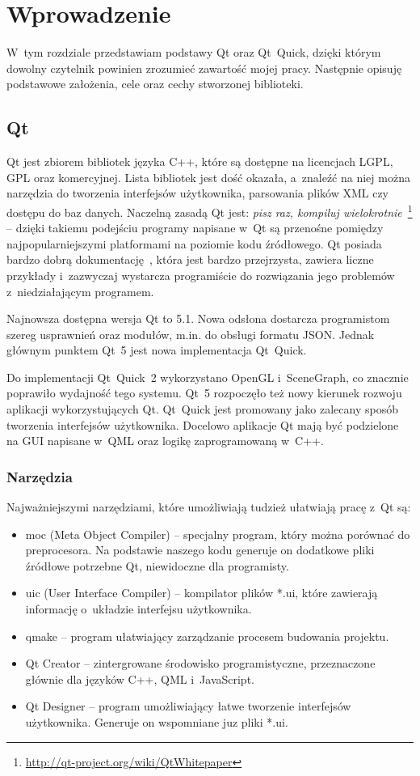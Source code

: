 \chapter{Wprowadzenie}
W~tym rozdziale przedstawiam podstawy Qt oraz Qt~Quick, dzięki którym dowolny czytelnik powinien zrozumieć zawartość mojej pracy. Następnie opisuję podstawowe założenia, cele oraz cechy stworzonej biblioteki.

\section{Qt}
Qt jest zbiorem bibliotek języka C++, które są dostępne na licencjach LGPL, GPL oraz komercyjnej. Lista bibliotek jest dość okazała, a~znaleźć na niej można narzędzia do tworzenia interfejsów użytkownika, parsowania plików XML czy dostępu do baz danych. Naczelną zasadą Qt jest: \textit{pisz raz, kompiluj wielokrotnie}~\footnote{\url{http://qt-project.org/wiki/QtWhitepaper}} -- dzięki takiemu podejściu programy napisane w~Qt są przenośne pomiędzy najpopularniejszymi platformami na poziomie kodu źródłowego. Qt posiada bardzo dobrą dokumentację~\cite{Qt:Dokumentacja}, która jest bardzo przejrzysta, zawiera liczne przykłady i~zazwyczaj wystarcza programiście do rozwiązania jego problemów z~niedziałającym programem.

Najnowsza dostępna wersja Qt to 5.1. Nowa odsłona dostarcza programistom szereg usprawnień oraz modułów, m.in. do obsługi formatu JSON. Jednak głównym punktem Qt~5 jest nowa implementacja Qt~Quick. 

Do implementacji Qt~Quick~2 wykorzystano OpenGL i~SceneGraph, co znacznie poprawiło wydajność tego systemu. Qt~5 rozpoczęło też nowy kierunek rozwoju aplikacji wykorzystujących Qt. Qt~Quick jest promowany jako zalecany sposób tworzenia interfejsów użytkownika. Docelowo aplikacje Qt mają być podzielone na GUI napisane w~QML oraz logikę zaprogramowaną w~C++.

\subsection{Narzędzia}
Najważniejszymi narzędziami, które umożliwiają tudzież ułatwiają pracę z~Qt są:
\begin{itemize}
\item moc (Meta Object Compiler) -- specjalny program, który można porównać do preprocesora. Na podstawie naszego kodu generuje on dodatkowe pliki źródłowe potrzebne Qt, niewidoczne dla programisty.
\item uic (User Interface Compiler) -- kompilator plików *.ui, które zawierają informację o~układzie interfejsu użytkownika.
\item qmake -- program ułatwiający zarządzanie procesem budowania projektu.
\item Qt Creator -- zintergrowane środowisko programistyczne, przeznaczone głównie dla języków C++, QML i~JavaScript.
\item Qt Designer -- program umożliwiający łatwe tworzenie interfejsów użytkownika. Generuje on wspomniane juz pliki *.ui.
\end{itemize}


